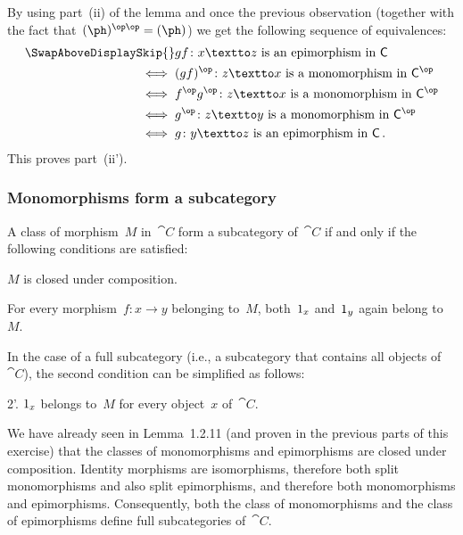 By using part~(ii) of the lemma and once the previous observation (together with the fact that~$(\ph)^{\op\op} = (\ph)$) we get the following sequence of equivalences:
\begin{align*}
	\SwapAboveDisplaySkip
	{}&
	\text{$gf \colon x \textto z$ is an epimorphism in~$\cat{C}$}
	\\
	\iff{}&
	\text{$(gf)^{\op} \colon z \textto x$ is a monomorphism in~$\cat{C}^{\op}$}
	\\
	\iff{}&
	\text{$f^{\op} g^{\op} \colon z \textto x$ is a monomorphism in~$\cat{C}^{\op}$}
	\\
	\iff{}&
	\text{$g^{\op} \colon z \textto y$ is a monomorphism in~$\cat{C}^{\op}$}
	\\
	\iff{}&
	\text{$g \colon y \textto z$ is an epimorphism in~$\cat{C}$} \,.
\end{align*}
This proves part~(ii').



\subsubsection{Monomorphisms form a subcategory}

A class of morphism~$M$ in~$\cat{C}$ form a subcategory of~$\cat{C}$ if and only if the following conditions are satisfied:
\begin{enumerate*}

	\item
		$M$ is closed under composition.

	\item
		For every morphism~$f \colon x \to y$ belonging to~$M$, both~$1_x$ and~$1_y$ again belong to~$M$.

\end{enumerate*}
In the case of a full subcategory (i.e., a subcategory that contains all objects of~$\cat{C}$), the second condition can be simplified as follows:
\begin{enumerate*}

	\item[2’.]
		$1_x$ belongs to~$M$ for every object~$x$ of~$\cat{C}$.

\end{enumerate*}

We have already seen in Lemma~1.2.11 (and proven in the previous parts of this exercise) that the classes of monomorphisms and epimorphisms are closed under composition.
Identity morphisms are isomorphisms, therefore both split monomorphisms and also split epimorphisms, and therefore both monomorphisms and epimorphisms.
Consequently, both the class of monomorphisms and the class of epimorphisms define full subcategories of~$\cat{C}$.
